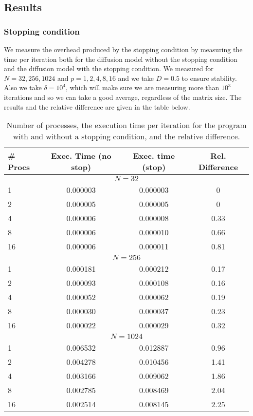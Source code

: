 \documentclass[11pt,a4paper,onecolumn]{article}
\begin{document}
\subsection{Results}
\subsubsection{Stopping condition}
We measure the overhead produced by the stopping condition by measuring the time per iteration both for the diffusion model without the stopping condition and the diffusion model with the stopping condition. We measured for $N = 32, 256, 1024$ and $p = 1, 2, 4, 8, 16$ and we take $D = 0.5$ to ensure stability. Also we take $\delta = 10^4$, which will make sure we are measuring more than $10^3$ iterations and so we can take a good average, regardless of the matrix size. The results and the relative difference are given in the table below.

\begin{table}[H]
  \centering
  \begin{tabular}{l | c | c | c}
    \# Procs & Exec. Time (no stop) & Exec. time (stop) & Rel. Difference \\
    \hline
    \multicolumn{4}{c}{$N = 32$}\\
    \hline
    1 & 0.000003 & 0.000003 & 0\\ 
    2 & 0.000005 & 0.000005 & 0\\
    4 & 0.000006 & 0.000008 & 0.33\\
    8 & 0.000006 & 0.000010 & 0.66\\
    16 & 0.000006 & 0.000011 & 0.81\\
    \hline
    \multicolumn{4}{c}{$N = 256$}\\
    \hline
    1 & 0.000181 & 0.000212 & 0.17\\ 
    2 & 0.000093 & 0.000108 & 0.16\\
    4 & 0.000052 & 0.000062 & 0.19\\
    8 & 0.000030 & 0.000037 & 0.23\\
    16 & 0.000022 & 0.000029 & 0.32\\
    \hline
    \multicolumn{4}{c}{$N = 1024$}\\
    \hline
    1 & 0.006532 & 0.012887 & 0.96\\ 
    2 & 0.004278 & 0.010456 & 1.41\\
    4 & 0.003166 & 0.009062 & 1.86\\
    8 & 0.002785 & 0.008469 & 2.04\\
    16 & 0.002514 & 0.008145 & 2.25\\
  \end{tabular}
  \caption{Number of processes, the execution time per iteration for the program with and without a stopping condition, and the relative difference.}
  \label{tab:stop}
\end{table}
\end{document}
